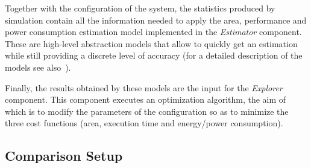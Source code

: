 Together with the configuration of the system, the statistics produced
by simulation contain all the information needed to apply the area,
performance and power consumption estimation model implemented in the
\emph{Estimator} component. These are high-level abstraction models
that allow to quickly get an estimation while still providing a
discrete level of accuracy (for a detailed description of the models
see also~\cite{palpatti_estimedia03}).

Finally, the results obtained by these
models are the input for the \emph{Explorer} component. This component
executes an optimization algorithm, the aim of which is to modify the
parameters of the configuration so as to minimize the three cost
functions (area, execution time and energy/power consumption).

%

\subsection{Comparison Setup}


